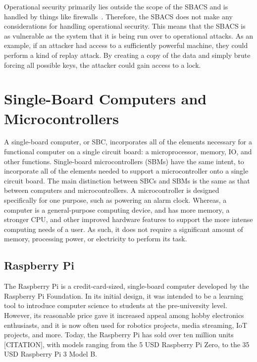 \documentclass[12pt]{report}
\let\Oldsection\section
\renewcommand{\section}{\FloatBarrier\Oldsection}
\let\Oldsubsection\subsection
\renewcommand{\subsection}{\FloatBarrier\Oldsubsection}
\begin{document}
Operational security primarily lies outside the scope of the SBACS and is handled by things like firewalls~\autocite
{NETWORKTEXTBOOK}. Therefore, the SBACS does not make any considerations for handling operational security. This means
that the SBACS is as vulnerable as the system that it is being run over to operational attacks. As an example, if an
attacker had access to a sufficiently powerful machine, they could perform a kind of replay attack. By creating a copy
of the data and simply brute forcing all possible keys, the attacker could gain access to a lock.


\section{Single-Board Computers and Microcontrollers} \label{single-board-computers-and-microcontrollers}

A single-board computer, or SBC, incorporates all of the elements necessary for a functional 
computer on a single circuit board: a microprocessor, memory, IO, and other functions. Single-board microcontrollers
(SBMs) have the same intent, to incorporate all of the elements needed to support a microcontroller onto a single
circuit board. The main distinction between SBCs and SBMs is the same as that between computers and microcontrollers.
A microcontroller is designed specifically for one  purpose, such as powering an alarm clock. Whereas, a
computer is a general-purpose computing device, and has more memory, a stronger CPU, and other improved hardware 
features to support the more intense computing needs of a user. As such, it does not require a significant amount of
memory, processing power, or electricity to perform its task.


\subsection{Raspberry Pi} \label{raspberry-pi}

The Raspberry Pi is a credit-card-sized, single-board computer developed by the Raspberry Pi Foundation. In its initial 
design, it was intended to be a learning tool to introduce computer science to students at the pre-university  
level. However, its reasonable price gave it increased appeal among hobby electronics enthusiasts, and it is now often 
used for robotics projects, media streaming, IoT projects, and more. Today, the Raspberry Pi has sold over ten million 
units [CITATION], with models ranging from the 5 USD Raspberry Pi Zero, to the 35 USD Raspberry Pi 3 Model B.
\end{document}
